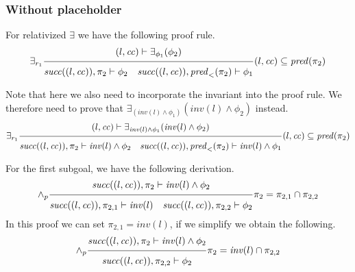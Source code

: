 \documentclass{article}
\newcommand{\proofrule}[3][]{#1 \frac{\raisebox{.7ex}{\normalsize{$#2$}}}
  {\raisebox{-1.0ex}{\normalsize{$#3$}}}}
\newcommand{\placeholder}[1][]{\pi_{#1}}
\newcommand{\loc}{l}
\newcommand{\region}{\mathit{cc}}
\newcommand{\suc}{\mathit{succ}}
\newcommand{\pre}{\mathit{pred}}
\newcommand{\inv}{\mathit{inv}}
\begin{document}
\subsubsection{Without placeholder}
For relativized $\exists$ we have the following proof rule.
\[
\proofrule[\exists_{r_1}]
{(\loc, \region) \vdash \exists_{\phi_1}(\phi_2)}
{\suc((\loc,\region)), \placeholder[2] \vdash \phi_2
\quad
\suc((\loc, \region)), \pre_{<}(\placeholder[2]) \vdash \phi_1
}
(\loc, \region) \subseteq \pre(\placeholder[2])
\]

Note that here we also need to incorporate the invariant into the proof rule. We therefore
need to prove that $\exists_{(\inv(\loc) \land \phi_1)}(\inv(\loc) \land \phi_2)$ instead.
\[
\proofrule[\exists_{r_1}]
{(\loc, \region) \vdash \exists_{\inv(\loc) \land \phi_1}(\inv(\loc) \land \phi_2)}
{\suc((\loc,\region)), \placeholder[2] \vdash \inv(\loc) \land \phi_2
\quad
\suc((\loc, \region)), \pre_{<}(\placeholder[2]) \vdash \inv(\loc) \land \phi_1
}
(\loc, \region) \subseteq \pre(\placeholder[2])
\]

For the first subgoal, we have the following derivation.
\[
\proofrule[\land_p]
{\suc((\loc,\region)), \placeholder[2] \vdash \inv(\loc) \land \phi_2}
{\suc((\loc,\region)), \placeholder[2,1] \vdash \inv(\loc)
\quad \suc((\loc,\region)), \placeholder[2,2] \vdash \phi_2}
\placeholder[2] = \placeholder[2,1] \cap \placeholder[2,2]
\]
In this proof we can set $\placeholder[2,1] = \inv(\loc)$, if we simplify we obtain the following.
\[
\proofrule[\land_p]
{\suc((\loc,\region)), \placeholder[2] \vdash \inv(\loc) \land \phi_2}
{\suc((\loc,\region)), \placeholder[2,2] \vdash \phi_2}
\placeholder[2] = \inv(\loc) \cap \placeholder[2,2]
\]
\end{document}
